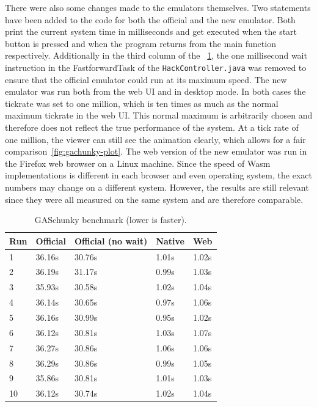 There were also some changes made to the emulators themselves.
Two statements have been added to the code for both the official and the new emulator.
Both print the current system time in milliseconds and get executed when the start button is pressed and when the program returns from the main function respectively.
Additionally in the third column of the ~\cref{table:gaschunky}, the one millisecond wait instruction in the FastforwardTask of the \verb+HackController.java+ was removed to ensure that the official emulator could run at its maximum speed.
The new emulator was run both from the web UI and in desktop mode.
In both cases the tickrate was set to one million, which is ten times as much as the normal maximum tickrate in the web UI.
This normal maximum is arbitrarily chosen and therefore does not reflect the true performance of the system.
At a tick rate of one million, the viewer can still see the animation clearly, which allows for a fair comparison~\ref{fig:gachunky-plot}.
The web version of the new emulator was run in the Firefox web browser on a Linux machine.
Since the speed of Wasm implementations is different in each browser and even operating system, the exact numbers may change on a different system.
However, the results are still relevant since they were all measured on the same system and are therefore comparable.

\begin{table}[ht]
  \begin{center}
    \centering
    \begin{tabular}{@{}lllll@{}}
      \toprule
      Run & Official & Official (no wait) & Native &   Web \\ \midrule
      1   &   36.16s &             30.76s &  1.01s & 1.02s \\
      2   &   36.19s &             31.17s &  0.99s & 1.03s \\
      3   &   35.93s &             30.58s &  1.02s & 1.04s \\
      4   &   36.14s &             30.65s &  0.97s & 1.06s \\
      5   &   36.16s &             30.99s &  0.95s & 1.02s \\
      6   &   36.12s &             30.81s &  1.03s & 1.07s \\
      7   &   36.27s &             30.86s &  1.06s & 1.06s \\
      8   &   36.29s &             30.86s &  0.99s & 1.05s \\
      9   &   35.86s &             30.81s &  1.01s & 1.03s \\
      10  &   36.12s &             30.74s &  1.02s & 1.04s \\ \bottomrule
    \end{tabular}
    \caption{GASchunky benchmark (lower is faster).}%
    \label{table:gaschunky}
  \end{center}
\end{table}

